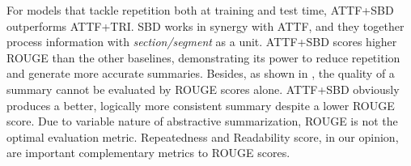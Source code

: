 For models that tackle repetition both at training and test time, 
ATTF+SBD outperforms ATTF+TRI.
SBD works in synergy with ATTF, and they together process 
information with \textit{section/segment} as a unit.
ATTF+SBD scores higher ROUGE than the other baselines, 
demonstrating its power to  reduce 
repetition and generate more accurate summaries.
Besides, as shown in , the quality of a summary cannot be evaluated by
ROUGE scores alone.
ATTF+SBD obviously produces a better, logically more consistent summary despite 
a lower ROUGE score.  
Due to variable nature of abstractive summarization, ROUGE is
not the optimal evaluation metric.
Repeatedness and Readability score, 
in our opinion, are important complementary metrics to ROUGE scores.  


